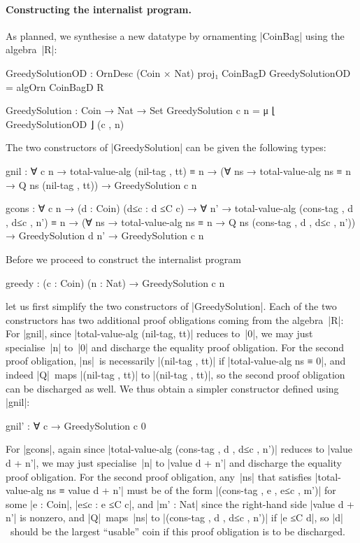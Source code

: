 \paragraph{Constructing the internalist program.}
As planned, we synthesise a new datatype by ornamenting |CoinBag| using the algebra~|R|:
\begin{code}
GreedySolutionOD : OrnDesc (Coin × Nat) proj₁ CoinBagD
GreedySolutionOD = algOrn CoinBagD R

GreedySolution : Coin → Nat → Set
GreedySolution c n = μ ⌊ GreedySolutionOD ⌋ (c , n)
\end{code}
The two constructors of |GreedySolution| can be given the following types:
\begin{code}
gnil :  ∀ {c n} →
        total-value-alg (nil-tag , tt) ≡ n →
        (∀ ns → total-value-alg ns ≡ n → Q ns (nil-tag , tt)) →
        GreedySolution c n

gcons :
  ∀ {c n} → (d : Coin) (d≤c : d ≤C c) →
  ∀ {n'} → total-value-alg (cons-tag , d , d≤c , n') ≡ n →
  (∀ ns → total-value-alg ns ≡ n → Q ns (cons-tag , d , d≤c , n')) →
  GreedySolution d n' → GreedySolution c n
\end{code}
Before we proceed to construct the internalist program
\begin{code}
greedy : (c : Coin) (n : Nat) → GreedySolution c n
\end{code}
let us first simplify the two constructors of |GreedySolution|.
Each of the two constructors has two additional proof obligations coming from the algebra~|R|:
For |gnil|, since |total-value-alg (nil-tag, tt)| reduces to~|0|, we may just specialise~|n| to~|0| and discharge the equality proof obligation.
For the second proof obligation,  |ns|~is necessarily |(nil-tag , tt)| if |total-value-alg ns ≡ 0|, and indeed |Q|~maps |(nil-tag , tt)| to |(nil-tag , tt)|, so the second proof obligation can be discharged as well.
We thus obtain a simpler constructor defined using |gnil|:
\begin{code}gnil' : ∀ {c} → GreedySolution c 0
\end{code}For |gcons|, again since |total-value-alg (cons-tag , d , d≤c , n')| reduces to |value d + n'|, we may just specialise~|n| to |value d + n'| and discharge the equality proof obligation.
For the second proof obligation, any~|ns| that satisfies |total-value-alg ns ≡ value d + n'| must be of the form |(cons-tag , e , e≤c , m')| for some |e : Coin|, |e≤c : e ≤C c|, and |m' : Nat| since the right-hand side |value d + n'| is nonzero, and |Q|~maps~|ns| to |(cons-tag , d , d≤c , n')| if |e ≤C d|, so |d|~should be the largest ``usable'' coin if this proof obligation is to be discharged.
